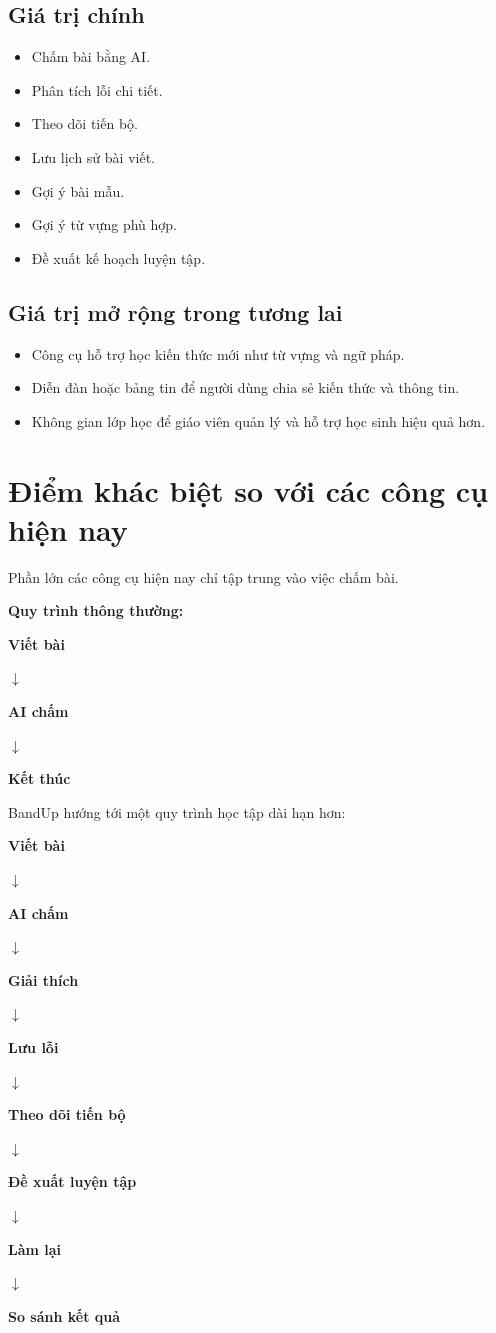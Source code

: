 \documentclass[12pt,a4paper]{article}
\newcommand{\flowarrow}{\par\centering\sffamily\color{BandBlue}\Large$\downarrow$\par}
\newcommand{\flowstep}[1]{\par\centering\sffamily\bfseries #1\par}
\begin{document}
\subsection{Giá trị chính}

\begin{itemize}
  \item Chấm bài bằng AI.
  \item Phân tích lỗi chi tiết.
  \item Theo dõi tiến bộ.
  \item Lưu lịch sử bài viết.
  \item Gợi ý bài mẫu.
  \item Gợi ý từ vựng phù hợp.
  \item Đề xuất kế hoạch luyện tập.
\end{itemize}

\subsection{Giá trị mở rộng trong tương lai}

\begin{itemize}
  \item Công cụ hỗ trợ học kiến thức mới như từ vựng và ngữ pháp.
  \item Diễn đàn hoặc bảng tin để người dùng chia sẻ kiến thức và thông tin.
  \item Không gian lớp học để giáo viên quản lý và hỗ trợ học sinh hiệu quả hơn.
\end{itemize}

\section{Điểm khác biệt so với các công cụ hiện nay}

Phần lớn các công cụ hiện nay chỉ tập trung vào việc chấm bài.

\begin{summarybox}
\textbf{Quy trình thông thường:}
\flowstep{Viết bài}
\flowarrow
\flowstep{AI chấm}
\flowarrow
\flowstep{Kết thúc}
\end{summarybox}

BandUp hướng tới một quy trình học tập dài hạn hơn:

\begin{summarybox}
\flowstep{Viết bài}
\flowarrow
\flowstep{AI chấm}
\flowarrow
\flowstep{Giải thích}
\flowarrow
\flowstep{Lưu lỗi}
\flowarrow
\flowstep{Theo dõi tiến bộ}
\flowarrow
\flowstep{Đề xuất luyện tập}
\flowarrow
\flowstep{Làm lại}
\flowarrow
\flowstep{So sánh kết quả}
\end{summarybox}
\end{document}

